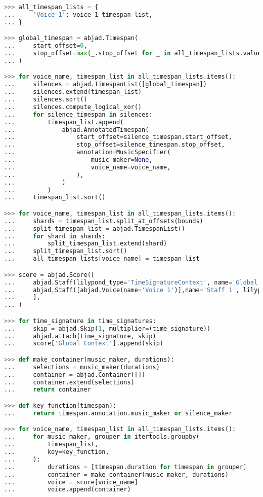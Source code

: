 \begin{lstlisting}[language=Python, caption=Using MusicMaker with PitchHandler]
>>> all_timespan_lists = {
...     'Voice 1': voice_1_timespan_list,
... }

>>> global_timespan = abjad.Timespan(
...     start_offset=0,
...     stop_offset=max(_.stop_offset for _ in all_timespan_lists.values())
... )

>>> for voice_name, timespan_list in all_timespan_lists.items():
...     silences = abjad.TimespanList([global_timespan])
...     silences.extend(timespan_list)
...     silences.sort()
...     silences.compute_logical_xor()
...     for silence_timespan in silences:
...         timespan_list.append(
...             abjad.AnnotatedTimespan(
...                 start_offset=silence_timespan.start_offset,
...                 stop_offset=silence_timespan.stop_offset,
...                 annotation=MusicSpecifier(
...                     music_maker=None,
...                     voice_name=voice_name,
...                 ),
...             )
...         )
...     timespan_list.sort()

>>> for voice_name, timespan_list in all_timespan_lists.items():
...     shards = timespan_list.split_at_offsets(bounds)
...     split_timespan_list = abjad.TimespanList()
...     for shard in shards:
...         split_timespan_list.extend(shard)
...     split_timespan_list.sort()
...     all_timespan_lists[voice_name] = timespan_list

>>> score = abjad.Score([
...     abjad.Staff(lilypond_type='TimeSignatureContext', name='Global Context'),
...     abjad.Staff([abjad.Voice(name='Voice 1')],name='Staff 1', lilypond_type='Staff',),
...     ],
... )

>>> for time_signature in time_signatures:
...     skip = abjad.Skip(1, multiplier=(time_signature))
...     abjad.attach(time_signature, skip)
...     score['Global Context'].append(skip)

>>> def make_container(music_maker, durations):
...     selections = music_maker(durations)
...     container = abjad.Container([])
...     container.extend(selections)
...     return container

>>> def key_function(timespan):
...     return timespan.annotation.music_maker or silence_maker

>>> for voice_name, timespan_list in all_timespan_lists.items():
...     for music_maker, grouper in itertools.groupby(
...         timespan_list,
...         key=key_function,
...     ):
...         durations = [timespan.duration for timespan in grouper]
...         container = make_container(music_maker, durations)
...         voice = score[voice_name]
...         voice.append(container)


\end{lstlisting}
